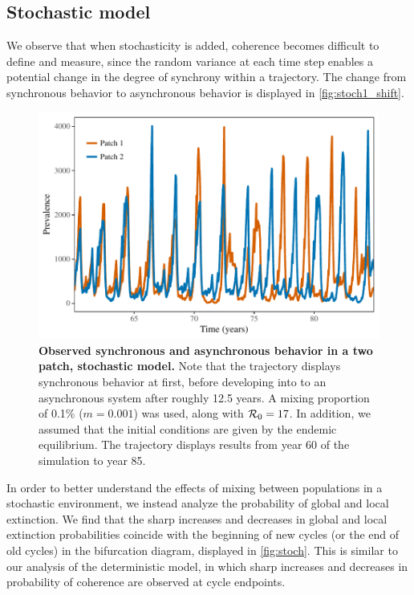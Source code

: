 \documentclass[12pt]{article}
\newcommand{\R}{{\cal R}}
\begin{document}
\subsection{Stochastic model} \label{ss:stochastic}

We observe that when stochasticity is added, coherence becomes difficult to define and measure, since the random variance at each time step enables a potential change in the degree of synchrony within a trajectory. The change from synchronous behavior to asynchronous behavior is displayed in \autoref{fig:stoch1_shift}.

\begin{figure}[h]
    \centering
    \includegraphics[width=\textwidth]{supplementary/stochastic_illustrate.pdf}
    \caption{\textbf{Observed synchronous and asynchronous behavior in a two patch, stochastic model.} Note that the trajectory displays synchronous behavior at first, before developing into to an asynchronous system after roughly 12.5 years. A mixing proportion of 0.1\% ($m = 0.001$) was used, along with $\R_0 = 17$. In addition, we assumed that the initial conditions are given by the endemic equilibrium. The trajectory displays results from year 60 of the simulation to year 85.}
    \label{fig:stoch1_shift}
\end{figure}

In order to better understand the effects of mixing between populations in a stochastic environment, we instead analyze the probability of global and local extinction. 
We find that the sharp increases and decreases in global and local extinction probabilities coincide with the beginning of new cycles (or the end of old cycles) in the bifurcation diagram, displayed in \autoref{fig:stoch}. 
This is similar to our analysis of the deterministic model, in which sharp increases and decreases in probability of coherence are observed at cycle endpoints.
\end{document}
